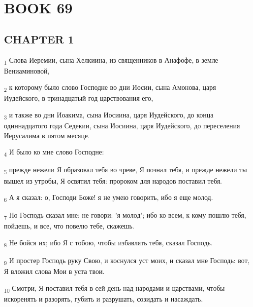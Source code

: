 \section{BOOK 69}
\subsection{CHAPTER 1}
\begin{tcolorbox}
\textsubscript{1} Слова Иеремии, сына Хелкиина, из священников в Анафофе, в земле Вениаминовой,
\end{tcolorbox}
\begin{tcolorbox}
\textsubscript{2} к которому было слово Господне во дни Иосии, сына Амонова, царя Иудейского, в тринадцатый год царствования его,
\end{tcolorbox}
\begin{tcolorbox}
\textsubscript{3} и также во дни Иоакима, сына Иосиина, царя Иудейского, до конца одиннадцатого года Седекии, сына Иосиина, царя Иудейского, до переселения Иерусалима в пятом месяце.
\end{tcolorbox}
\begin{tcolorbox}
\textsubscript{4} И было ко мне слово Господне:
\end{tcolorbox}
\begin{tcolorbox}
\textsubscript{5} прежде нежели Я образовал тебя во чреве, Я познал тебя, и прежде нежели ты вышел из утробы, Я освятил тебя: пророком для народов поставил тебя.
\end{tcolorbox}
\begin{tcolorbox}
\textsubscript{6} А я сказал: о, Господи Боже! я не умею говорить, ибо я еще молод.
\end{tcolorbox}
\begin{tcolorbox}
\textsubscript{7} Но Господь сказал мне: не говори: 'я молод'; ибо ко всем, к кому пошлю тебя, пойдешь, и все, что повелю тебе, скажешь.
\end{tcolorbox}
\begin{tcolorbox}
\textsubscript{8} Не бойся их; ибо Я с тобою, чтобы избавлять тебя, сказал Господь.
\end{tcolorbox}
\begin{tcolorbox}
\textsubscript{9} И простер Господь руку Свою, и коснулся уст моих, и сказал мне Господь: вот, Я вложил слова Мои в уста твои.
\end{tcolorbox}
\begin{tcolorbox}
\textsubscript{10} Смотри, Я поставил тебя в сей день над народами и царствами, чтобы искоренять и разорять, губить и разрушать, созидать и насаждать.
\end{tcolorbox}
